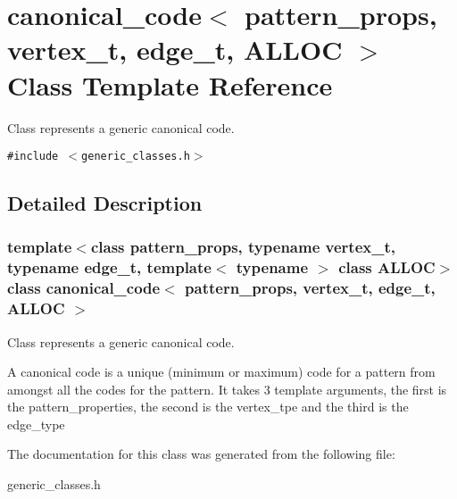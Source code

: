 \section{canonical\_\-code$<$ pattern\_\-props, vertex\_\-t, edge\_\-t, ALLOC $>$ Class Template Reference}
\label{classcanonical__code}
Class represents a generic canonical code.  


{\tt \#include $<$generic\_\-classes.h$>$}



\subsection{Detailed Description}
\subsubsection*{template$<$class pattern\_\-props, typename vertex\_\-t, typename edge\_\-t, template$<$ typename $>$ class ALLOC$>$ class canonical\_\-code$<$ pattern\_\-props, vertex\_\-t, edge\_\-t, ALLOC $>$}

Class represents a generic canonical code. 

A canonical code is a unique (minimum or maximum) code for a pattern from amongst all the codes for the pattern. It takes 3 template arguments, the first is the pattern\_\-properties, the second is the vertex\_\-tpe and the third is the edge\_\-type 



The documentation for this class was generated from the following file:\begin{CompactItemize}
\item 
generic\_\-classes.h\end{CompactItemize}

